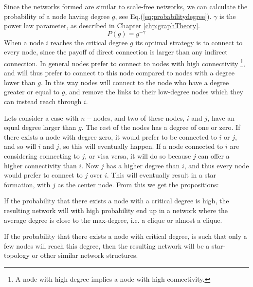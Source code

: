 Since the networks formed are similar to scale-free networks, we can calculate the probability of a node having degree $g$, see Eq.(\ref{eq:probabilitydegree}). $\gamma$ is the power law parameter, as described in Chapter \ref{chp:graphTheory}.
\begin{equation}
P(g)=g^{-\gamma}
\label{eq:probabilitydegree}
\end{equation}
When a node $i$ reaches the critical degree $g$ its optimal strategy is to connect to every node, since the payoff of direct connection is larger than any indirect connection. In general nodes prefer to connect to nodes with high connectivity \footnote{A node with high degree implies a node with high connectivity.}, and will thus prefer to connect to this node compared to nodes with a degree lower than $g$. In this way nodes will connect to the node who have a degree greater or equal to $g$, and remove the links to their low-degree nodes which they can instead reach through  $i$.

Lets consider a case with $n-$nodes, and two of these nodes, $i$ and $j$, have an equal degree larger than $g$. The rest of the nodes has a degree of one or zero. If there exists a node with degree zero, it would prefer to be connected to $i$ or $j$, and so will $i$ and $j$, so this will eventually happen.
If a node connected to $i$ are considering connecting to $j$, or visa versa, it will do so because $j$ can offer a higher connectivity than $i$. Now $j$ has a higher degree than $i$, and thus every node would prefer to connect to $j$ over $i$. This will eventually result in a star formation, with $j$ as the center node.
From this we get the propositions:
\begin{cnj}
If the probability that there exists a node with a critical degree is high, the resulting network will with high probability end up in a network where the average degree is close to the max-degree, i.e. a clique or almost a clique.
\label{prop:clique}
\end{cnj}

\begin{cnj}
If the probability that there exists a node with critical degree, is such that only a few nodes will reach this degree, then the resulting network will be a star-topology or other similar network structures. 
\label{prop:star}
\end{cnj} 

